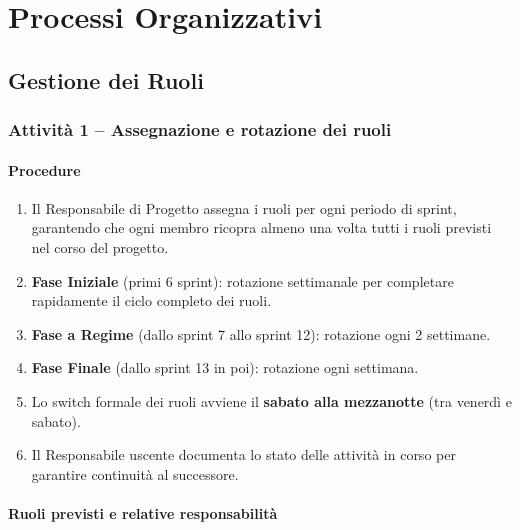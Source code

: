 \documentclass[a4paper, 11pt, oneside]{scrartcl}
\begin{document}
\newpage
\section{Processi Organizzativi}
\label{sec:processi_organizzativi}

\subsection{Gestione dei Ruoli}

\subsubsection{Attività 1 – Assegnazione e rotazione dei ruoli}

\paragraph{Procedure}
\begin{enumerate}
    \item Il Responsabile di Progetto assegna i ruoli per ogni periodo di sprint, garantendo che ogni membro ricopra almeno una volta tutti i ruoli previsti nel corso del progetto.
    \item \textbf{Fase Iniziale} (primi 6 sprint): rotazione settimanale per completare rapidamente il ciclo completo dei ruoli.
    \item \textbf{Fase a Regime} (dallo sprint 7 allo sprint 12): rotazione ogni 2 settimane.
    \item \textbf{Fase Finale} (dallo sprint 13 in poi): rotazione ogni settimana.
    \item Lo switch formale dei ruoli avviene il \textbf{sabato alla mezzanotte} (tra venerdì e sabato).
    \item Il Responsabile uscente documenta lo stato delle attività in corso per garantire continuità al successore.
\end{enumerate}

\paragraph{Ruoli previsti e relative responsabilità}
\end{document}
